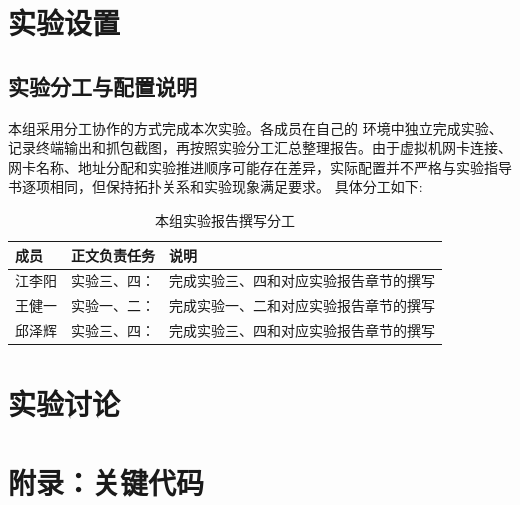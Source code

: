 \documentclass{lab1report}
\newcommand{\labinputexperiment}[1]{%
    \titleformat{\section}[block]{\centering\heiti\zihao{3}}{\thesection}{0.75em}{}%
    \titleformat{\section}{\heiti\zihao{3}}{\thesection}{0.75em}{}%
}
\begin{document}
\makecover




\section{实验设置}

\subsection{实验分工与配置说明}

本组采用分工协作的方式完成本次实验。各成员在自己的 环境中独立完成实验、记录终端输出和抓包截图，再按照实验分工汇总整理报告。由于虚拟机网卡连接、网卡名称、地址分配和实验推进顺序可能存在差异，实际配置并不严格与实验指导书逐项相同，但保持拓扑关系和实验现象满足要求。
具体分工如下:
\begin{table}[H]
    \centering
    \caption{本组实验报告撰写分工}
    \label{tab:group-division}
    \renewcommand{\arraystretch}{1.35}
    \begin{tabularx}{\linewidth}{>{\raggedright\arraybackslash}p{3.0cm} >{\raggedright\arraybackslash}p{3.2cm} X}
        \toprule
        成员 & 正文负责任务 & 说明 \\
        \midrule
        江李阳 & 实验三、四：&完成实验三、四和对应实验报告章节的撰写 \\
        王健一 & 实验一、二：&完成实验一、二和对应实验报告章节的撰写 \\
        邱泽辉 & 实验三、四：&完成实验三、四和对应实验报告章节的撰写 \\
        \bottomrule
    \end{tabularx}
\end{table}


\labinputexperiment{content/task1.tex}

\labinputexperiment{content/task2.tex}

\labinputexperiment{content/task3.tex}

\labinputexperiment{content/task4.tex}

\section{实验讨论}


\newpage
\appendix
\section{附录：关键代码}
\label{appendix:key-code}

\end{document}
